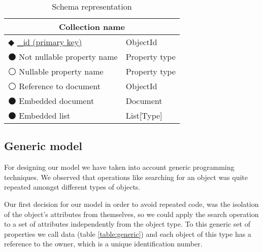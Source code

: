 \begin{table}[!htb]
\centering
\caption{Schema representation}
\label{table:schema}
    \begin{tabular}{|ll|}
        \hline
        \multicolumn{2}{|c|}{\textbf{Collection name}}       \\ \hline
        $\Diamondblack$ \underline{\_id (primary key)}  & ObjectId   \\ 
        $\medbullet$ Not nullable property name           & Property type                    \\ 
        $\medcirc$ Nullable property name      & Property type                         \\
        $\medcirc$ Reference to document     & ObjectId                         \\
        $\medbullet$ Embedded document      & Document                         \\ 
        $\medbullet$ Embedded list      & List[Type]                         \\ \hline
        
        
    \end{tabular}
\end{table}

\subsection {Generic model}

For designing our model we have taken into account generic programming techniques. We observed that operations like searching for an object was quite repeated amongst different types of objects. 

Our first decision for our model in order to avoid repeated code, was the isolation of the object's attributes from themselves, so we could apply the search operation to a set of attributes independently from the object type. To this generic set of properties we call data (table \ref{table:generic}) and each object of this type has a reference to the owner, which is a unique identification number.

